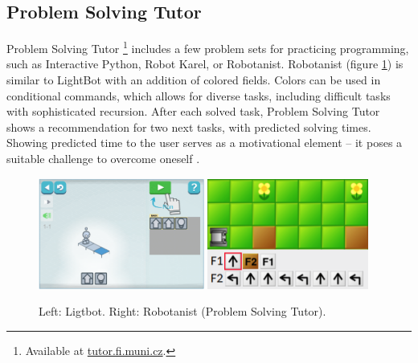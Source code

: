 %


\subsection{Problem Solving Tutor}
\label{sec:problem-solving-tutor}
Problem Solving Tutor%
\footnote{Available at \url{tutor.fi.muni.cz}.}
includes a few problem sets for practicing programming,
such as Interactive Python, Robot Karel, or Robotanist.
Robotanist (figure \ref{fig:lightbot-robotanist}) is similar to LightBot
with an addition of colored fields.
Colors can be used in conditional commands, which allows for diverse tasks,
including difficult tasks with sophisticated recursion.  After
each solved task, Problem Solving Tutor shows a recommendation for two next
tasks, with predicted solving times.
Showing predicted time to the user serves as a motivational element -- it poses
a suitable challenge to overcome oneself
\cite{pelanek-student-modeling-times}.


\begin{figure}[htb]
\begin{center}
  \includegraphics[width=0.485\textwidth]{img/lightbot-instruction}
  \includegraphics[width=0.47\textwidth]{img/robotanist}
\end{center}
\caption{%
  Left: Ligtbot.
  Right: Robotanist (Problem Solving Tutor).}
\label{fig:lightbot-robotanist}
\end{figure}




